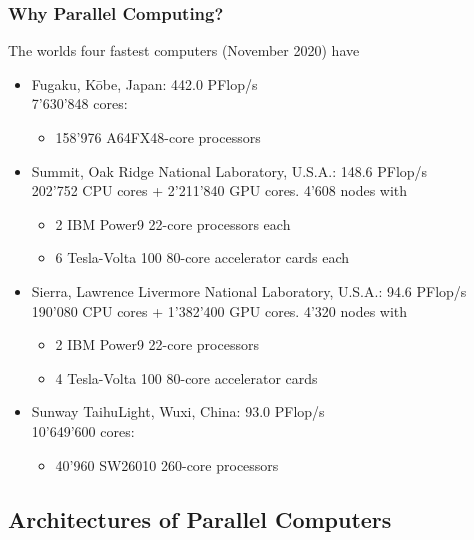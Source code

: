 \documentclass[aspectratio=169,11pt]{beamer}
\theoremstyle{definition}
\begin{document}
\begin{frame}
\frametitle<presentation>{Why Parallel Computing?}

The worlds four fastest computers (November 2020) have
\begin{itemize} 
\item Fugaku, Kōbe, Japan: 442.0 PFlop/s\\
7'630'848 cores:
\begin{itemize}
\item 158'976 A64FX48-core processors\\
\end{itemize}
\item Summit, Oak Ridge National Laboratory, U.S.A.: 148.6 PFlop/s\\
202'752 CPU cores + 2'211'840 GPU cores. 4'608 nodes with 
\begin{itemize}
\item 2 IBM Power9 22-core processors each
\item 6 Tesla-Volta 100 80-core accelerator cards each
\end{itemize}
\item Sierra, Lawrence Livermore National Laboratory, U.S.A.: 94.6 PFlop/s\\
190'080 CPU cores + 1'382'400 GPU cores. 4'320 nodes with 
\begin{itemize}
\item 2 IBM Power9 22-core processors
\item 4 Tesla-Volta 100 80-core accelerator cards
\end{itemize}
\item Sunway TaihuLight, Wuxi, China: 93.0 PFlop/s\\
10'649'600 cores:
\begin{itemize}
\item 40'960 SW26010 260-core processors\\
\end{itemize}
\end{itemize}

\end{frame}

\subsection{Architectures of Parallel Computers}
\end{document}
